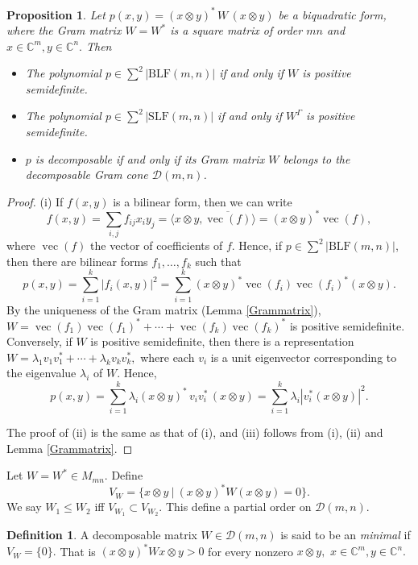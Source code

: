 \documentclass[12pt,a4paper]{amsart}
\theoremstyle{plain}
\newtheorem{proposition}[theorem]{Proposition}
\theoremstyle{remark}
\theoremstyle{definition}
\newtheorem{defn}[theorem]{Definition}
\def \C {\mathbb{C}}
\begin{document}
\begin{proposition}\label{SOS}
Let $p(x,y) = (x\otimes y)^{*}\,W\,(x\otimes y)$ be a biquadratic form, where the Gram matrix $W=W^*$ is a square matrix of order $mn$ and $x\in \C^m, y\in \C^n.$ Then 
\begin{itemize}
	\item[(i)] The polynomial $p \in {\sum}^2|\mathrm{BLF} (m,n)| $ if and only if $W$ is positive semidefinite.
	\item[(ii)] The polynomial  $p\in {\sum}^2 |\mathrm{SLF}(m,n)|$ if and only if $W^{\Gamma}$ is positive semidefinite.
	\item[(iii)] $p$ is decomposable if and only if its Gram matrix $W$ belongs to the decomposable Gram cone $\mathcal D (m,n)$.
\end{itemize} 
\end{proposition}
\begin{proof}
(i) If $f(x,y)$ is a bilinear form, then we can write
$$
f(x,y) = \sum_{i,j} f_{ij}x_iy_j = \langle x\otimes y, \overline{\operatorname{vec}(f)}\rangle = (x\otimes y)^* {\operatorname{vec}(f)} ,  
$$ 
where $\operatorname{vec}(f)$ the vector of coefficients of $f.$ Hence, if $p \in {\sum}^2|\mathrm{BLF} (m,n)| $, then there are bilinear forms $f_1, \ldots, f_k$ such that 
$$p(x,y) = \sum_{i=1}^k |f_i(x,y)|^2  = \sum_{i=1}^k (x\otimes y)^*{\operatorname{vec}(f_i)}{\operatorname{vec}(f_i)}^*(x\otimes y).  $$
By the uniqueness of the Gram matrix (Lemma \ref{Grammatrix}), $W = {\operatorname{vec}(f_1)}{\operatorname{vec}(f_1)}^* + \cdots + {\operatorname{vec}(f_k)}{\operatorname{vec}(f_k)}^* $ is positive semidefinite. 
Conversely, if $W$ is positive semidefinite, then there is a representation $W = \lambda_1v_1v_1^* + \cdots + \lambda_k v_kv_k^*,$ where each $v_i$ is a unit eigenvector corresponding to the eigenvalue $\lambda_i$ of $W.$ Hence,
$$p(x,y) =  \sum_{i=1}^k \lambda_i (x\otimes y)^{*}\, v_iv_i^* \,(x\otimes y)  = \sum_{i=1}^k \lambda_i |v_i^*(x\otimes y)|^2.$$

The proof of (ii) is the same as that of (i), and (iii) follows from (i), (ii) and Lemma \ref{Grammatrix}. 
\end{proof}
Let $W=W^* \in M_{mn}.$ Define
$$
V_W = \{x\otimes y \ | \ (x\otimes y)^* W (x\otimes y) =0\}.
$$
We say $W_1 \le W_2 $ iff $V_{W_1} \subset V_{W_2}.$ This define a partial order on $\mathcal{D}(m,n).$
\begin{defn}%
A decomposable matrix $W\in \mathcal{D}(m,n)$ is said to be an \textit{minimal} if $V_W= \{0\}.$  That is $(x\otimes y)^* W x\otimes y>0$ for every nonzero $x\otimes y,$ $x\in \C^m, y\in \C^n.$
\end{defn}
\end{document}
